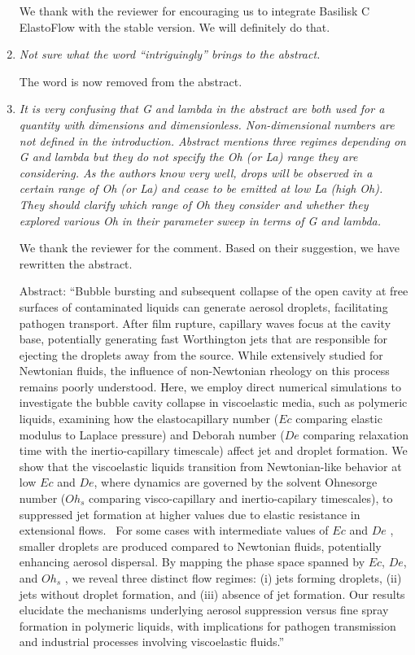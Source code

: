\documentclass[]{article}
\newcommand{\oo}{\color{magenta} \normalfont}
\newcommand{\bb}{\color{black} \normalfont}
\begin{document}
\begin{enumerate}
      We thank with the reviewer for encouraging us to integrate Basilisk C ElastoFlow \citep{vatsalElastoFlow2024} with the stable version. We will definitely do that.

      \item \textit{Not sure what the word “intriguingly” brings to the abstract.}

       The word is now removed from the abstract.

      \item \textit{It is very confusing that G and lambda in the abstract are both used for a quantity with dimensions and dimensionless. Non-dimensional numbers are not defined in the introduction. Abstract mentions three regimes depending on G and lambda but they do not specify the Oh (or La) range they are considering. As the authors know very well, drops will be observed in a certain range of Oh (or La) and cease to be emitted at low La (high Oh). They should clarify which range of Oh they consider and whether they explored various Oh in their parameter sweep in terms of G and lambda.}

	  We thank the reviewer for the comment. Based on their suggestion, we have rewritten the abstract.

	  Abstract:
      ``Bubble bursting and subsequent collapse of the open cavity at free surfaces of contaminated liquids can generate aerosol droplets, facilitating pathogen transport. After film rupture, capillary waves focus at the cavity base, potentially generating fast Worthington jets that are responsible for ejecting the droplets away from the source. While extensively studied for Newtonian fluids, the influence of non-Newtonian rheology on this process remains poorly understood.
      \oo
      Here, we employ direct numerical simulations to investigate the bubble cavity collapse in viscoelastic media, such as polymeric liquids, examining how the elastocapillary number ($Ec$ comparing elastic modulus to Laplace pressure) and Deborah number ($De$ comparing relaxation time with the inertio-capillary timescale) affect jet and droplet formation.
      We show that the viscoelastic liquids transition from Newtonian-like behavior at low $Ec$ and $De$, where dynamics are governed by the solvent Ohnesorge number ($Oh_s$ comparing visco-capillary and inertio-capilary timescales), to suppressed jet formation at higher values due to elastic resistance in extensional flows.\bb\,
      For some cases with intermediate values of \oo$Ec$ and $De$\bb, smaller droplets are produced compared to Newtonian fluids, potentially enhancing aerosol dispersal. By mapping the phase space spanned by \oo$Ec$, $De$, and $Oh_s$\bb, we reveal three distinct flow regimes: (i) jets forming droplets, (ii) jets without droplet formation, and (iii) absence of jet formation. Our results elucidate the mechanisms underlying aerosol suppression versus fine spray formation in polymeric liquids, with implications for pathogen transmission and industrial processes involving viscoelastic fluids.''


\end{enumerate}
\end{document}

